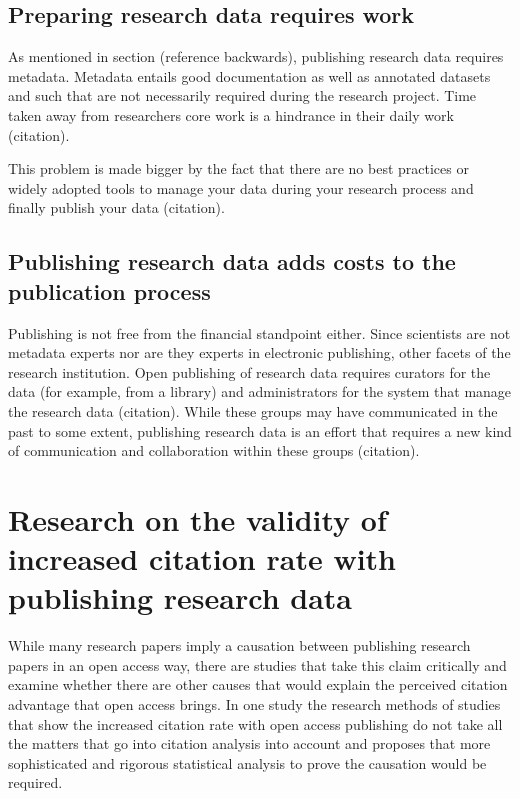\subsection{Preparing research data requires work}

As mentioned in section (reference backwards), publishing research data
requires metadata. Metadata entails good documentation as well as annotated
datasets and such that are not necessarily required during the research
project. Time taken away from researchers core work is a hindrance in their
daily work (citation).

This problem is made bigger by the fact that there are no best practices or
widely adopted tools to manage your data during your research process and
finally publish your data (citation).

\subsection{Publishing research data adds costs to the publication process}

Publishing is not free from the financial standpoint either. Since scientists
are not metadata experts nor are they experts in electronic publishing, other
facets of the research institution. Open publishing of research data requires
curators for the data (for example, from a library) and administrators for the
system that manage the research data (citation). While these groups may have
communicated in the past to some extent, publishing research data is an effort
that requires a new kind of communication and collaboration within these groups
(citation).

\fi

\section[Validity of the benefit research]{Research on the validity of increased citation rate with publishing
research data}

While many research papers imply a causation between publishing research papers
in an open access way, there are studies that take this claim critically and
examine whether there are other causes that would explain the perceived
citation advantage that open access brings. In one study
\cite{DBLP:journals/joi/CraigPMPA07} the research methods of studies that show
the increased citation rate with open access publishing do not take all the
matters that go into citation analysis into account and proposes that more
sophisticated and rigorous statistical analysis to prove the causation would
be required.

